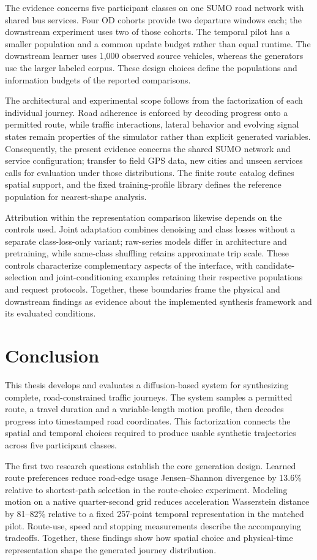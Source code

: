 The evidence concerns five participant classes on one SUMO road network with shared bus services. Four OD cohorts provide two departure windows each; the downstream experiment uses two of those cohorts. The temporal pilot has a smaller population and a common update budget rather than equal runtime. The downstream learner uses 1,000 observed source vehicles, whereas the generators use the larger labeled corpus. These design choices define the populations and information budgets of the reported comparisons.

The architectural and experimental scope follows from the factorization of each individual journey. Road adherence is enforced by decoding progress onto a permitted route, while traffic interactions, lateral behavior and evolving signal states remain properties of the simulator rather than explicit generated variables. Consequently, the present evidence concerns the shared SUMO network and service configuration; transfer to field GPS data, new cities and unseen services calls for evaluation under those distributions. The finite route catalog defines spatial support, and the fixed training-profile library defines the reference population for nearest-shape analysis.

Attribution within the representation comparison likewise depends on the controls used. Joint adaptation combines denoising and class losses without a separate class-loss-only variant; raw-series models differ in architecture and pretraining, while same-class shuffling retains approximate trip scale. These controls characterize complementary aspects of the interface, with candidate-selection and joint-conditioning examples retaining their respective populations and request protocols. Together, these boundaries frame the physical and downstream findings as evidence about the implemented synthesis framework and its evaluated conditions.

\section{Conclusion}
This thesis develops and evaluates a diffusion-based system for synthesizing complete, road-constrained traffic journeys. The system samples a permitted route, a travel duration and a variable-length motion profile, then decodes progress into timestamped road coordinates. This factorization connects the spatial and temporal choices required to produce usable synthetic trajectories across five participant classes.

The first two research questions establish the core generation design. Learned route preferences reduce road-edge usage Jensen--Shannon divergence by 13.6\% relative to shortest-path selection in the route-choice experiment. Modeling motion on a native quarter-second grid reduces acceleration Wasserstein distance by 81--82\% relative to a fixed 257-point temporal representation in the matched pilot. Route-use, speed and stopping measurements describe the accompanying tradeoffs. Together, these findings show how spatial choice and physical-time representation shape the generated journey distribution.

